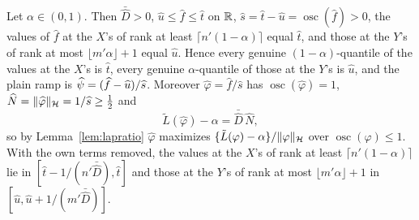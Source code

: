 \begin{lemma}
\label{lem:lapclip}
Let $\alpha\in(0,1)$. Then $\bar{\widehat D}>0$, $\widehat u\le\widehat f\le\widehat t$ on $\mathbb{R}$, $\widehat s=\widehat t-\widehat u
=\operatorname{osc}(\widehat f)>0$, the values of $\widehat f$ at the $X$'s of rank at least $\lceil n'(1-\alpha)\rceil$
equal $\widehat t$, and those at the $Y$'s of rank at most $\lfloor m'\alpha\rfloor+1$ equal $\widehat u$. Hence every
genuine $(1-\alpha)$-quantile of the values at the $X$'s is $\widehat t$, every genuine $\alpha$-quantile of those at the
$Y$'s is $\widehat u$, and the plain ramp is $\widehat{\psi}=(\widehat f-\widehat u)/\widehat s$. Moreover
$\widehat\varphi=\widehat f/\widehat s$ has $\operatorname{osc}(\widehat\varphi)=1$, $\widehat N=\|\widehat\varphi\|_{\mathcal{H}}=
1/\widehat s\ge\tfrac12$ and
\[
\tilde L(\widehat\varphi)-\alpha=\bar{\widehat D}\,\widehat N ,
\]
so by Lemma~\ref{lem:lapratio} $\widehat\varphi$ maximizes $\{\tilde L(\varphi)-\alpha\}/\|\varphi\|_{\mathcal{H}}$ over
$\operatorname{osc}(\varphi)\le1$. With the own terms removed, the values at the $X$'s of rank at least
$\lceil n'(1-\alpha)\rceil$ lie in $[\widehat t-1/(n'\bar{\widehat D}),\widehat t]$ and those at the $Y$'s of rank at most
$\lfloor m'\alpha\rfloor+1$ in $[\widehat u,\widehat u+1/(m'\bar{\widehat D})]$.
\end{lemma}

